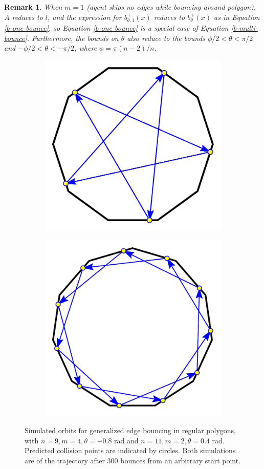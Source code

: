 \documentclass[letterpaper, 10 pt, conference]{ieeeconf}  %
\newtheorem{remark}{\bf Remark}
\begin{document}
\begin{remark} When $m=1$ (agent skips no edges while bouncing around polygon), $A$
reduces to $l$, and the expression for $b^+_{\theta, 1}(x)$ reduces to
$b^+_{\theta}(x)$ as in Equation \ref{b-one-bounce}, so Equation
\ref{b-one-bounce} is a special case of Equation \ref{b-multi-bounce}.
Furthermore, the bounds on $\theta$ also reduce to the bounds $\phi/2 < \theta < \pi/2$ and $-\phi/2 < \theta < -\pi/2$, where $\phi=\pi(n-2)/n$.
\end{remark}

\begin{figure}[th]
\begin{subfigure}{.25\textwidth}
\centering

\includegraphics[width=0.7\linewidth]{../figs/nonagon_neg0pt8rad_skip3.pdf}

\end{subfigure}%
\begin{subfigure}{0.25\textwidth}

\includegraphics[width=0.7\linewidth]{../figs/eleven_limit_m2.pdf}

\end{subfigure}

\caption{Simulated orbits for generalized edge bouncing in
regular polygons, with $n=9, m=4, \theta=-0.8$ rad and $n=11, m=2, \theta=0.4$
rad. Predicted collision points are indicated by circles. Both simulations are of the trajectory after 300 bounces
from an arbitrary start point. \label{ccw-m-bounce}}
\end{figure}
\end{document}
